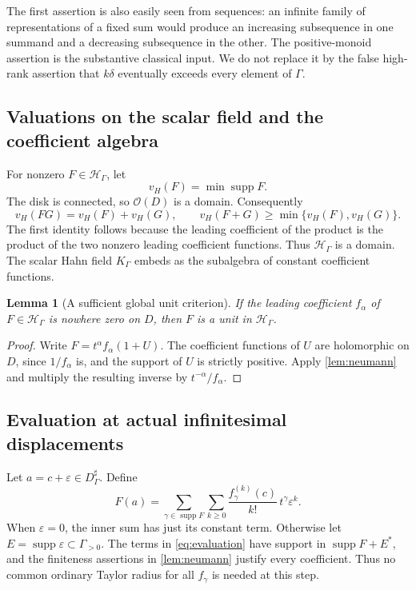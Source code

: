 \documentclass[11pt,letterpaper]{article}
\numberwithin{equation}{section}
\newtheorem{lemma}[theorem]{Lemma}
\theoremstyle{definition}
\theoremstyle{remark}
\newcommand{\OO}{\mathcal O}
\newcommand{\HH}{\mathcal H}
\newcommand{\vH}{v_{\!H}}
\newcommand{\supp}{\operatorname{supp}}
\begin{document}
The first assertion is also easily seen from sequences: an infinite
family of representations of a fixed sum would produce an increasing
subsequence in one summand and a decreasing subsequence in the other.
The positive-monoid assertion is the substantive classical input. We do
not replace it by the false high-rank assertion that $k\delta$ eventually
exceeds every element of $\Gamma$.

\subsection{Valuations on the scalar field and the coefficient algebra}
For nonzero $F\in\HH_\Gamma$, let
\[
 \vH(F)=\min\supp F.
\]
The disk is connected, so $\OO(D)$ is a domain. Consequently
\begin{equation}\label{eq:global-valuation}
 \vH(FG)=\vH(F)+\vH(G),\qquad
 \vH(F+G)\ge\min\{\vH(F),\vH(G)\}.
\end{equation}
The first identity follows because the leading coefficient of the product
is the product of the two nonzero leading coefficient functions. Thus
$\HH_\Gamma$ is a domain. The scalar Hahn field $K_\Gamma$ embeds as the
subalgebra of constant coefficient functions.

\begin{lemma}[A sufficient global unit criterion]\label{lem:global-unit}
If the leading coefficient $f_\alpha$ of $F\in\HH_\Gamma$ is nowhere
zero on $D$, then $F$ is a unit in $\HH_\Gamma$.
\end{lemma}
\begin{proof}
Write $F=t^\alpha f_\alpha(1+U)$. The coefficient functions of $U$ are
holomorphic on $D$, since $1/f_\alpha$ is, and the support of $U$ is
strictly positive. Apply \cref{lem:neumann} and multiply the resulting
inverse by $t^{-\alpha}/f_\alpha$.
\end{proof}

\subsection{Evaluation at actual infinitesimal displacements}
Let $a=c+\varepsilon\in D^\sharp_\Gamma$. Define
\begin{equation}\label{eq:evaluation}
 F(a)=\sum_{\gamma\in\supp F}\sum_{k\ge0}
     \frac{f_\gamma^{(k)}(c)}{k!}\,t^\gamma\varepsilon^k.
\end{equation}
When $\varepsilon=0$, the inner sum has just its constant term. Otherwise
let $E=\supp\varepsilon\subset\Gamma_{>0}$. The terms in
\eqref{eq:evaluation} have support in $\supp F+E^*$, and the finiteness
assertions in \cref{lem:neumann} justify every coefficient. Thus no common
ordinary Taylor radius for all $f_\gamma$ is needed at this step.
\end{document}
